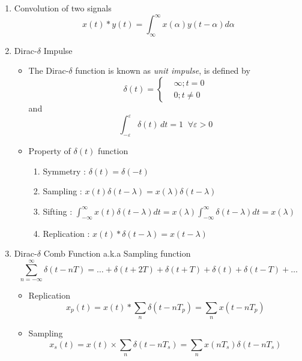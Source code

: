 \documentclass{article}
\begin{document}
\begin{enumerate}
\begin{figure}[h]
        \label{fig:enter-label}
    \end{figure}
    \item Convolution of two signals
    \begin{equation}
        x(t)*y(t) = \int^{\infty}_{\infty}x(\alpha)y(t-\alpha)d\alpha
    \end{equation}
    \newpage
    \item Dirac-$\delta$ Impulse
    \begin{itemize}
        \item The Dirac-$\delta$ function is known as \textit{unit impulse}, is defined by
        \begin{equation}
            \delta(t) = 
            \begin{cases}
                & \infty ; t = 0\\
                & 0      ; t \neq 0
            \end{cases}
        \end{equation}
    and 
    \begin{equation}
        \int^{\varepsilon}_{-\varepsilon}\delta(t)\, dt = 1 \;\; \forall\varepsilon > 0
    \end{equation}
    \item Property of $\delta(t)$ function
        \begin{enumerate}
            \item Symmetry : $\delta(t) = \delta(-t)$
            \item Sampling : $x(t)\delta(t-\lambda) = x(\lambda)\delta(t-\lambda)$
            \item Sifting : $\int^{\infty}_{-\infty}x(t)\delta(t-\lambda)dt = x(\lambda)\int^{\infty}_{-\infty}\delta(t-\lambda)dt = x(\lambda)$
            \item Replication : $x(t)*\delta(t-\lambda) = x(t-\lambda)$
        \end{enumerate}
    \end{itemize}
    \item Dirac-$\delta$ Comb Function a.k.a Sampling function
    \begin{equation}
        \sum^{\infty}_{n=-\infty}\delta(t-nT) = \dots + \delta(t+2T)+\delta(t+T)+\delta(t)+\delta(t-T)+\dots
    \end{equation}
    \begin{itemize}
        \item Replication
            \[x_p(t) = x(t)*\sum_{n}\delta(t-nT_p) = \sum_n x(t- nT_p)\]
        \item Sampling
            \[x_s(t) = x(t)\times\sum_n\delta(t-nT_s)=\sum_n x(nT_s)\delta(t - nT_s)\]
    \end{itemize}
\end{enumerate}
\end{document}
